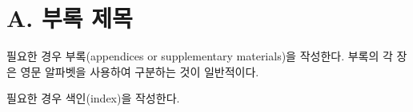 \documentclass[11pt]{report}
\begin{document}

\normalsize
{} 
\section*{A. 부록 제목} %
필요한 경우 부록(appendices or supplementary materials)을 작성한다.
부록의 각 장은 영문 알파벳을 사용하여 구분하는 것이 일반적이다.


\renewcommand{\indexname}{색인}
\printindex
\bigskip

필요한 경우 색인(index)을 작성한다.
\end{document}
